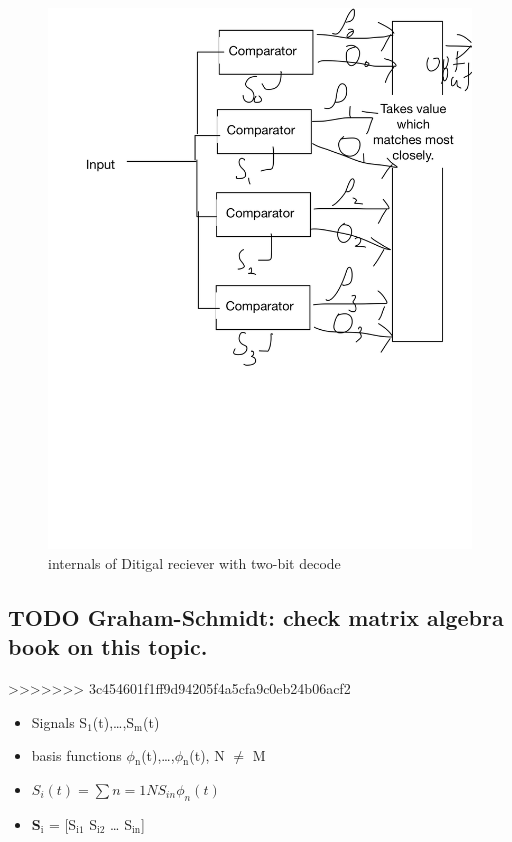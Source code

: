 \documentclass[11pt]{article}
\begin{document}
\begin{figure}[htb]
\centering
\includegraphics[width=.9\linewidth]{./img/Digital_reciever.png}
\caption{internals of Ditigal reciever with two-bit decode}
\end{figure}

\subsection{{\bfseries\sffamily TODO} Graham-Schmidt: check matrix algebra book on this topic.}
\label{sec-4-3}

>>>>>>> 3c454601f1ff9d94205f4a5cfa9c0eb24b06acf2

\begin{itemize}
\item Signals S$_{\text{1}}$(t),\ldots{},S$_{\text{m}}$(t)
\item basis functions $\phi$$_{\text{n}}$(t),\ldots{},$\phi$$_{\text{n}}$(t), N $\neq$ M
\item \(S_i(t) = \sum{n=1}{N}{S_{in} \phi_n(t)}\)
\item \textbf{S$_{\text{i}}$} = [S$_{\text{i1}}$ S$_{\text{i2}}$ \ldots{} S$_{\text{in}}$]
\end{itemize}
\end{document}
